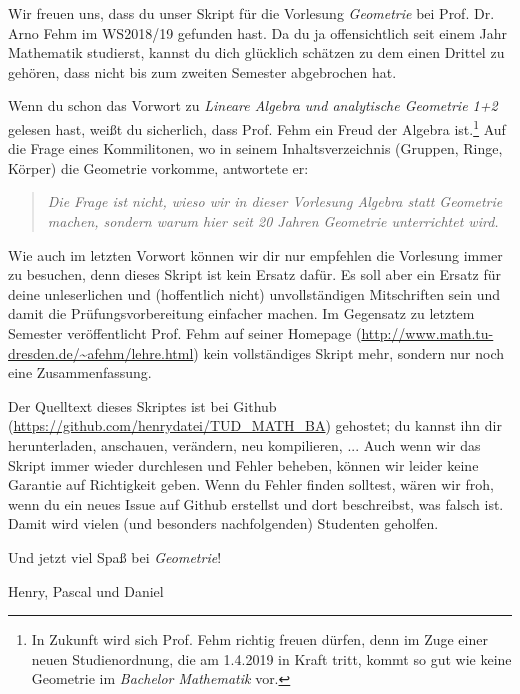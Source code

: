 Wir freuen uns, dass du unser Skript für die Vorlesung \textit{Geometrie} bei Prof. Dr. Arno Fehm im WS2018/19 gefunden hast. Da du ja offensichtlich seit einem Jahr Mathematik studierst, kannst du dich glücklich schätzen zu dem einen Drittel zu gehören, dass nicht bis zum zweiten Semester abgebrochen hat.

Wenn du schon das Vorwort zu \textit{Lineare Algebra und analytische Geometrie 1+2} gelesen hast, weißt du sicherlich, dass Prof. Fehm ein Freud der Algebra ist.\footnote{In Zukunft wird sich Prof. Fehm richtig freuen dürfen, denn im Zuge einer neuen Studienordnung, die am 1.4.2019 in Kraft tritt, kommt so gut wie keine Geometrie im \textit{Bachelor Mathematik} vor.} Auf die Frage eines Kommilitonen, wo in seinem Inhaltsverzeichnis (Gruppen, Ringe, Körper) die Geometrie vorkomme, antwortete er:
\begin{quote}
	\textit{Die Frage ist nicht, wieso wir in dieser Vorlesung Algebra statt Geometrie machen, sondern warum hier seit 20 Jahren Geometrie unterrichtet wird.}
\end{quote}

Wie auch im letzten Vorwort können wir dir nur empfehlen die Vorlesung immer zu besuchen, denn dieses Skript ist kein Ersatz dafür. Es soll aber ein Ersatz für deine unleserlichen und (hoffentlich nicht) unvollständigen Mitschriften sein und damit die Prüfungsvorbereitung einfacher machen. Im Gegensatz zu letztem Semester veröffentlicht Prof. Fehm auf seiner Homepage (\url{http://www.math.tu-dresden.de/~afehm/lehre.html}) kein vollständiges Skript mehr, sondern nur noch eine Zusammenfassung.

Der Quelltext dieses Skriptes ist bei Github (\url{https://github.com/henrydatei/TUD_MATH_BA}) gehostet; du kannst ihn dir herunterladen, anschauen, verändern, neu kompilieren, ... Auch wenn wir das Skript immer wieder durchlesen und Fehler beheben, können wir leider keine Garantie auf Richtigkeit geben. Wenn du Fehler finden solltest, wären wir froh, wenn du ein neues Issue auf Github erstellst und dort beschreibst, was falsch ist. Damit wird vielen (und besonders nachfolgenden) Studenten geholfen.

Und jetzt viel Spaß bei \textit{Geometrie}!

\begin{flushright}
	Henry, Pascal und Daniel
\end{flushright}